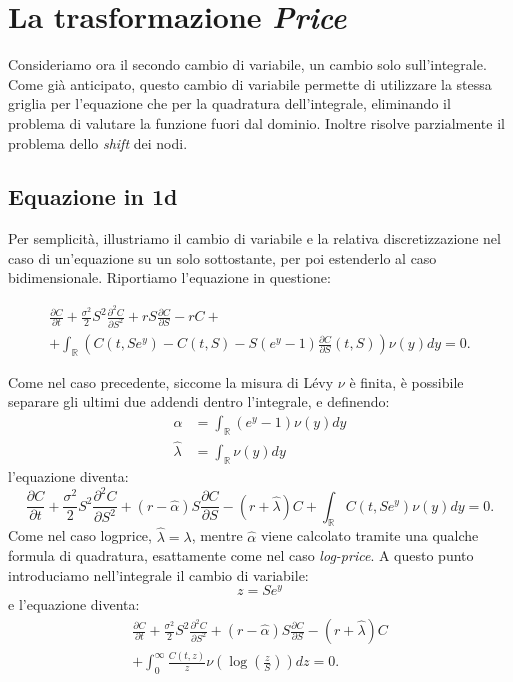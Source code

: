 \documentclass[a4paper,10pt]{report}
\newcommand{\der}[2]{\frac{\partial #1}{\partial #2}}
\newcommand{\dder}[2]{\frac{\partial^2 #1}{\partial #2^2}}
\theoremstyle{plain}
\theoremstyle{definition}
\theoremstyle{remark}
\begin{document}

\section{La trasformazione \emph{Price}}
\label{sec:Price}
Consideriamo ora il secondo cambio di variabile, un cambio solo sull'integrale. Come già anticipato, questo cambio di variabile permette di utilizzare la stessa griglia per l'equazione che per la quadratura dell'integrale, eliminando il problema di valutare la funzione fuori dal dominio. Inoltre risolve parzialmente il problema dello \emph{shift} dei nodi.
\subsection{Equazione in 1d}
Per semplicità, illustriamo il cambio di variabile e la relativa discretizzazione nel caso di un'equazione su un solo sottostante, per poi estenderlo al caso bidimensionale. Riportiamo l'equazione in questione:

\begin{multline*}
\label{eq:PIDE1d_will_price}
\der{C}{t}+\frac{\sigma^2}{2}S^2\dder{C}{S}+rS\der{C}{S}-rC+\\+ \int_\mathbb{R}\left(C(t,Se^y)-C(t,S)-S(e^y-1)\der{C}{S}(t,S)\right)\nu(y)dy=0.
\end{multline*}

Come nel caso precedente, siccome la misura di Lévy $\nu$ è finita, è possibile separare gli ultimi due addendi dentro l'integrale, e definendo:
\begin{align*}
 \hat{\alpha}&=\int_\mathbb{R}(e^y-1)\nu(y)dy \\
 \hat{\lambda}&=\int_\mathbb{R}\nu(y)dy
\end{align*}
l'equazione diventa:
\begin{equation*}
\der{C}{t}+\frac{\sigma^2}{2}S^2\dder{C}{S}+(r-\hat{\alpha})S\der{C}{S}-(r+\hat{\lambda})C+ \int_\mathbb{R}C(t,Se^y)\nu(y)dy=0.
\end{equation*}
Come nel caso logprice, $\hat{\lambda}=\lambda$, mentre $\hat{\alpha}$ viene calcolato tramite una qualche formula di quadratura, esattamente come nel caso \emph{log-price}. A questo punto introduciamo nell'integrale il cambio di variabile:
\begin{equation*}
 z=Se^y
\end{equation*}
e l'equazione diventa:
\begin{multline}
\label{eq:PIDEinPrice}
\der{C}{t}+\frac{\sigma^2}{2}S^2\dder{C}{S}+(r-\hat{\alpha})S\der{C}{S}-(r+\hat{\lambda})C\\+\int_0^\infty \frac{C(t,z)}{z}\nu\left(\log\left(\frac{z}{S}\right) \right)dz=0.
\end{multline}
\end{document}
